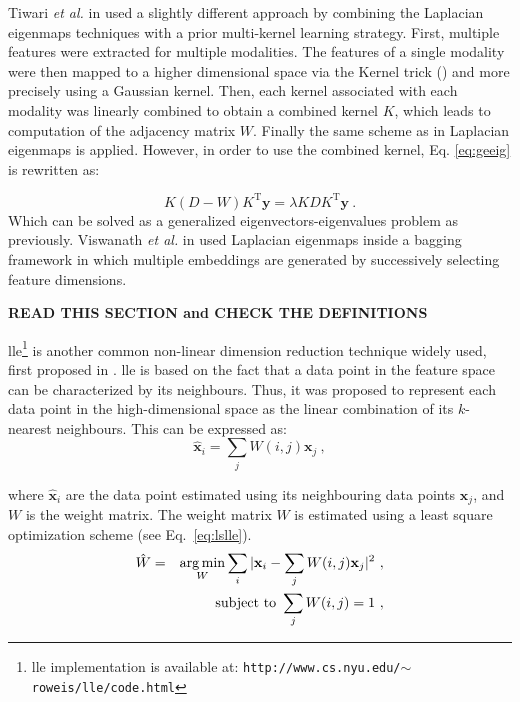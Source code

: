 Tiwari \textit{et al.} in \cite{Tiwari2009,Tiwari2013} used a slightly different approach by combining the Laplacian eigenmaps techniques with a prior multi-kernel learning strategy.
First, multiple features were extracted for multiple modalities.
The features of a single modality were then mapped to a higher dimensional space via the Kernel trick (\cite{Aizerman1964}) and more precisely using a Gaussian kernel.
Then, each kernel associated with each modality was linearly combined to obtain a combined kernel $K$, which leads to computation of the adjacency matrix $W$.
Finally the same scheme as in Laplacian eigenmaps is applied.
However, in order to use the combined kernel, Eq. \eqref{eq:geeig} is rewritten as:

\begin{equation}
	K (D-W) K^{\text{T}} \mathbf{y} = \lambda K D K^{\text{T}} \mathbf{y} \ .
	\label{eq:sesmik}
\end{equation}
\noindent Which can be solved as a generalized eigenvectors-eigenvalues problem as previously.
Viswanath \textit{et al.} in \cite{Viswanath2011} used Laplacian eigenmaps inside a bagging framework in which multiple embeddings are generated by successively selecting feature dimensions.

{\color{red} \textbf{READ THIS SECTION and CHECK THE DEFINITIONS}}

\Ac{lle}\footnote{\ac{lle} implementation is available at: \texttt{http://www.cs.nyu.edu/\allowbreak $\sim$roweis/lle/code.html}} is another common non-linear dimension reduction technique widely used, first proposed in \cite{Roweis2000}.
\ac{lle} is based on the fact that a data point in the feature space can be characterized by its neighbours.
Thus, it was proposed to represent each data point in the high-dimensional space as the linear combination of its $k$-nearest neighbours.
This can be expressed as:
\begin{equation}
	\hat{\mathbf{x}}_i = \sum_j W(i,j) \mathbf{x}_j \ ,
	\label{eq:lincomlle}
\end{equation}

\noindent where $\hat{\mathbf{x}}_i$ are the data point estimated using its neighbouring data points $\mathbf{x}_j$, and $W$ is the weight matrix.
The weight matrix $W$ is estimated using a least square optimization scheme (see Eq.~\eqref{eq:lslle}).
\begin{eqnarray}
	\hat{W} & = & \operatorname*{arg\,min}_{W} \sum_i | \mathbf{x}_i - \sum_j W(i,j)\mathbf{x}_j |^{2} \ , \label{eq:lslle} \\
	&& \text{subject to } \sum_j W(i,j) = 1 \ , \nonumber
\end{eqnarray}

